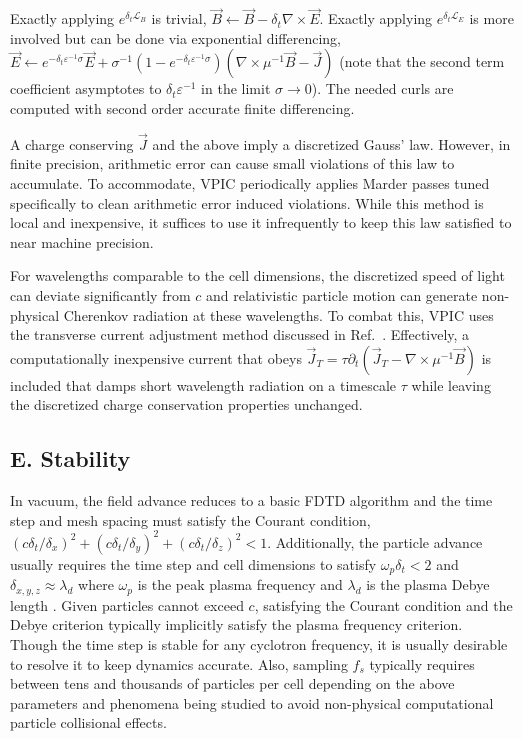 \documentclass[letter,10pt]{article}
\newcommand{\eps}{\varepsilon}
\newcommand{\vecJ}{\vec{J}}
\newcommand{\vecE}{\vec{E}}
\newcommand{\vecB}{\vec{B}}
\newcommand{\op}{\mathcal{L}}
\newcommand{\PDeriv}[2]{\partial_{#2}#1}
\newcommand{\Curl}[1]{\nabla \times #1}
\begin{document}
Exactly applying $e^{\delta_t \op_B}$ is trivial, $\vecB \leftarrow
\vecB - \delta_t \Curl{\vecE}$.  Exactly applying
$e^{\delta_t \op_E}$ is more involved but can be done via
exponential differencing, $\vecE \leftarrow e^{-\delta_t \eps^{-1}
\sigma} \vecE +
\sigma^{-1}\left( 1 - e^{-\delta_t \eps^{-1} \sigma} \right)
\left( \Curl{\mu^{-1}\vecB} - \vecJ \right)$ (note that the second
term coefficient asymptotes to $\delta_t \eps^{-1}$ in the limit
$\sigma \rightarrow 0$).  The needed curls are computed with second
order accurate finite differencing.

A charge conserving $\vecJ$ and the above imply a discretized Gauss'
law.  However, in finite precision, arithmetic error can cause small
violations of this law to accumulate.  To accommodate, VPIC
periodically applies Marder passes \cite{Marder_1987} tuned
specifically to clean arithmetic error induced violations.  While this
method is local and inexpensive, it suffices to use it infrequently to
keep this law satisfied to near machine precision.

For wavelengths comparable to the cell dimensions, the discretized
speed of light can deviate significantly from $c$ and relativistic
particle motion can generate non-physical Cherenkov radiation at these
wavelengths.  To combat this, VPIC uses the transverse current
adjustment method discussed in Ref.~\cite{Eastwood_et_al_1995}.
Effectively, a computationally inexpensive current that obeys $\vecJ_T
= \tau \PDeriv{\left(\vecJ_T - \Curl{\mu^{-1}\vecB}\right)}{t}$ is
included that damps short wavelength radiation on a timescale $\tau$
while leaving the discretized charge conservation properties unchanged.

\subsection{E. Stability}

In vacuum, the field advance reduces to a basic FDTD algorithm
\cite{Yee_1966} and the time step and mesh spacing must satisfy the
Courant condition,
$\left(c\delta_t/\delta_x\right)^2 +
 \left(c\delta_t/\delta_y\right)^2 +
 \left(c\delta_t/\delta_z\right)^2 < 1$.
Additionally, the particle advance usually requires the time step and
cell dimensions to satisfy $\omega_p \delta_t < 2$ and $\delta_{x,y,z}
\approx \lambda_d$ where $\omega_p$ is the peak plasma frequency and
$\lambda_d$ is the plasma Debye length
\cite{Birdsall_Langdon_1985,Hockney_Eastwood_1988}.
Given particles cannot exceed $c$, satisfying the Courant condition
and the Debye criterion typically implicitly satisfy the plasma
frequency criterion.  Though the time step is stable for any cyclotron
frequency, it is usually desirable to resolve it to keep dynamics
accurate.  Also, sampling $f_s$ typically requires between tens and
thousands of particles per cell depending on the above parameters and
phenomena being studied to avoid non-physical computational particle
collisional effects.
\end{document}
